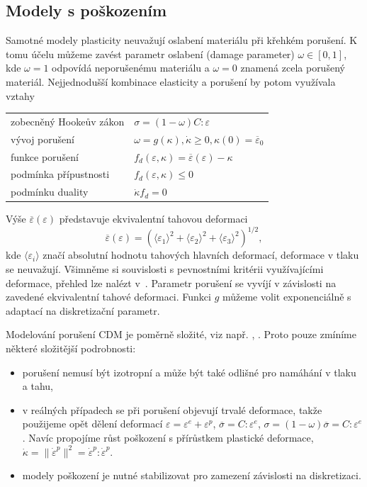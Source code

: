\documentclass{article}
\begin{document}
\subsection{Modely s poškozením}
Samotné modely plasticity neuvažují oslabení materiálu při křehkém porušení. K tomu účelu můžeme zavést parametr oslabení (damage parameter) $\omega\in[0,1]$, kde $\omega = 1$ odpovídá neporušenému materiálu a $\omega = 0$ znamená zcela porušený materiál. Nejjednodušší kombinace elasticity a porušení by potom využívala vztahy
\begin{table}[h!]
	\centering
	\begin{tabular}{ll}
		\hline
		zobecněný Hookeův zákon & $\sigma = (1-\omega)C : \varepsilon$\\
		vývoj porušení & $\omega = g(\kappa), \dot{\kappa} \geq 0, \kappa(0) = \overline{\varepsilon}_0$\\
		funkce porušení & $f_d(\varepsilon,\kappa)=\overline{\varepsilon}(\varepsilon)-\kappa$\\
		podmínka přípustnosti & $f_d(\varepsilon,\kappa)\leq 0$ \\
		podmínku duality & $\dot{\kappa} f_d =0$\\
		\hline
	\end{tabular}
\end{table}

Výše $\overline{\varepsilon}(\varepsilon)$ představuje ekvivalentní tahovou deformaci
$$
	\overline{\varepsilon}(\varepsilon) = (\langle\varepsilon_1\rangle^2+\langle\varepsilon_2\rangle^2+\langle\varepsilon_3\rangle^2)^{1/2},
$$
kde $\langle\varepsilon_i\rangle$ značí absolutní hodnotu tahových hlavních deformací, deformace v
tlaku se neuvažují. Všimněme si souvislosti s pevnostními kritérii využívajícími deformace, přehled lze nalézt v~\cite{kwasniewski_strain_based_2010}.
Parametr porušení se vyvíjí v závislosti na zavedené ekvivalentní tahové deformaci. Funkci $g$ můžeme volit exponenciálně s adaptací na diskretizační parametr.

Modelování porušení CDM je poměrně složité, viz např. \cite{Lemaitre1992}, \cite{Neto2011}. Proto pouze zmíníme některé složitější podrobnosti:
\begin{itemize}
	\item porušení nemusí být izotropní a může být také odlišné pro namáhání v tlaku a tahu,
	\item v reálných případech se při porušení objevují trvalé deformace, takže
	použijeme opět dělení deformací $\varepsilon=\varepsilon^e + \varepsilon^p$, $\overline{\sigma} = C : \varepsilon^e$, $\sigma = (1-\omega)\overline{\sigma} = C : \varepsilon^e$. Navíc propojíme růst poškození s přírůstkem plastické deformace, $\dot{\kappa} = \|\dot{\varepsilon}^p\|^2 = \dot{\varepsilon}^p : \dot{\varepsilon}^p$.
	\item modely poškození je nutné stabilizovat pro zamezení závislosti na diskretizaci.
\end{itemize}
\end{document}
